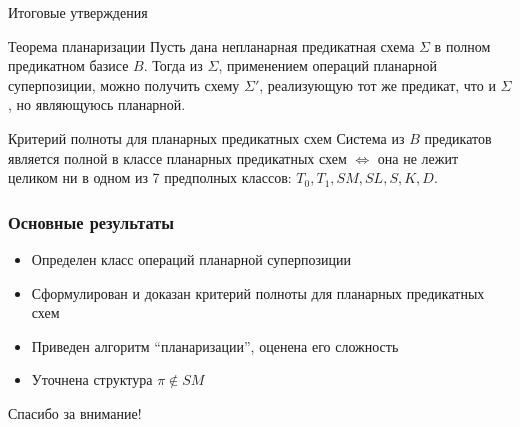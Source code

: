 \documentclass{beamer}
\begin{document}
\begin{frame}{Итоговые утверждения}
    \begin{block}{Теорема планаризации}
    \label{Theo2}
    Пусть дана непланарная предикатная схема $\Sigma$ в полном предикатном базисе $B$. 
    Тогда из $\Sigma$, применением операций планарной суперпозиции, можно получить схему $\Sigma'$,
    реализующую тот же предикат, что и $\Sigma$, но являющуюсь планарной.
    \end{block}
    \begin{block}{Критерий полноты для планарных предикатных схем}
    Система из $B$ предикатов является полной в классе планарных предикатных схем $\iff$
    она не лежит целиком ни в одном из 7 предполных классов: $T_0, T_1, SM, SL, S, K, D$. 
    \end{block}
\end{frame}

\begin{frame}
	\frametitle{Основные результаты}
    \begin{block}{}
	\begin{itemize}
        \item Определен класс операций планарной суперпозиции
		\item Сформулирован и доказан критерий полноты для планарных предикатных схем 
		\item Приведен алгоритм ``планаризации'', оценена его сложность
		\item Уточнена структура $\pi \notin SM$
	\end{itemize}
    \end{block}{}
\end{frame}

\begin{frame}{}
	\begin{center}
		\LARGE{Спасибо за внимание!}
	\end{center}
\end{frame}
\end{document}
